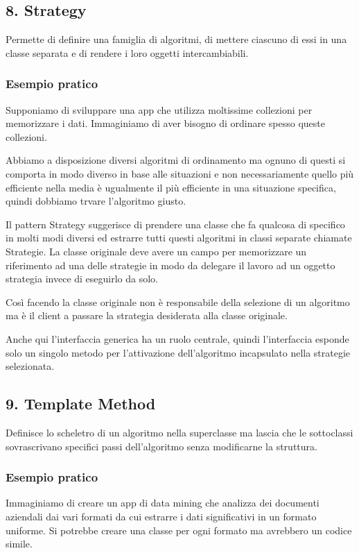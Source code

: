 \documentclass{report}
\begin{document}
\subsection*{8. Strategy}
Permette di definire una famiglia di algoritmi, di mettere ciascuno di essi in una classe separata e di rendere i loro oggetti intercambiabili.

\subsubsection*{Esempio pratico}
Supponiamo di sviluppare una app che utilizza moltissime collezioni per memorizzare i dati. Immaginiamo di aver bisogno di ordinare spesso queste collezioni.

\noindent
Abbiamo a disposizione diversi algoritmi di ordinamento ma ognuno di questi si comporta in modo diverso in base alle situazioni e non necessariamente quello più efficiente nella media è ugualmente il più efficiente in una situazione specifica, quindi dobbiamo trvare l'algoritmo giusto.

\medskip
\noindent
Il pattern Strategy suggerisce di prendere una classe che fa qualcosa di specifico in molti modi diversi ed estrarre tutti questi algoritmi in classi separate chiamate Strategie. La classe originale deve avere un campo per memorizzare un riferimento ad una delle strategie in modo da delegare il lavoro ad un oggetto strategia invece di eseguirlo da solo.

\noindent
Così facendo la classe originale non è responsabile della selezione di un algoritmo ma è il client a passare la strategia desiderata alla classe originale.

\noindent
Anche qui l'interfaccia generica ha un ruolo centrale, quindi l'interfaccia esponde solo un singolo metodo per l'attivazione dell'algoritmo incapsulato nella strategie selezionata.

\subsection*{9. Template Method}
Definisce lo scheletro di un algoritmo nella superclasse ma lascia che le sottoclassi sovrascrivano specifici passi dell'algoritmo senza modificarne la struttura.

\subsubsection*{Esempio pratico}
Immaginiamo di creare un app di data mining che analizza dei documenti aziendali dai vari formati da cui estrarre i dati significativi in un formato uniforme. Si potrebbe creare una classe per ogni formato ma avrebbero un codice simile.
\end{document}

